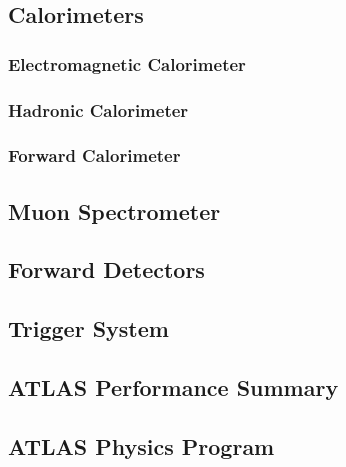 \subsection{Calorimeters}

\subsubsection*{Electromagnetic Calorimeter}


\subsubsection*{Hadronic Calorimeter}


\subsubsection*{Forward Calorimeter}


\subsection{Muon Spectrometer}


\subsection{Forward Detectors}

\subsection{Trigger System}
\label{sec:cern:trigger}

\subsection{ATLAS Performance Summary}


\subsection{ATLAS Physics Program}